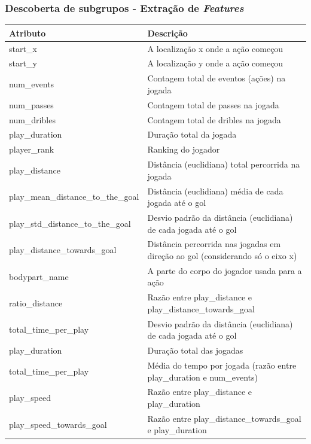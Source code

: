 \documentclass{beamer}
\begin{document}
\begin{frame}
\frametitle{Descoberta de subgrupos - Extração de \textit{Features}}
    \begin{table}[H]
        \centering
        \fontsize{6}{10}\selectfont %
        \begin{tabularx}{\textwidth}{|l|X|}
            \hline
            \textbf{Atributo} & \textbf{Descrição} \\
            \hline
            start\_x & A localização x onde a ação começou \\
            \hline
            start\_y & A localização y onde a ação começou \\
            \hline
            num\_events & Contagem total de eventos (ações) na jogada \\
            \hline
            num\_passes & Contagem total de passes na jogada \\
            \hline
            num\_dribles & Contagem total de dribles na jogada \\
            \hline
            play\_duration & Duração total da jogada \\
            \hline
            player\_rank & Ranking do jogador \\
            \hline
            play\_distance & Distância (euclidiana) total percorrida na jogada \\
            \hline
            play\_mean\_distance\_to\_the\_goal & Distância (euclidiana) média de cada jogada até o gol \\
            \hline
            play\_std\_distance\_to\_the\_goal & Desvio padrão da distância (euclidiana) de cada jogada até o gol \\
            \hline
            play\_distance\_towards\_goal & Distância percorrida nas jogadas em direção ao gol (considerando só o eixo x) \\
            \hline
            bodypart\_name & A parte do corpo do jogador usada para a ação \\
            \hline
            ratio\_distance & Razão entre play\_distance e play\_distance\_towards\_goal \\
            \hline
            total\_time\_per\_play & Desvio padrão da distância (euclidiana) de cada jogada até o gol \\
            \hline
            play\_duration & Duração total das jogadas \\
            \hline
            total\_time\_per\_play & Média do tempo por jogada (razão entre play\_duration e num\_events) \\
            \hline
            play\_speed & Razão entre play\_distance e play\_duration \\
            \hline
            play\_speed\_towards\_goal & Razão entre play\_distance\_towards\_goal e play\_duration \\
            \hline
        \end{tabularx}
        \label{tab:atributosSD}
    \end{table}
\end{frame}
\end{document}
